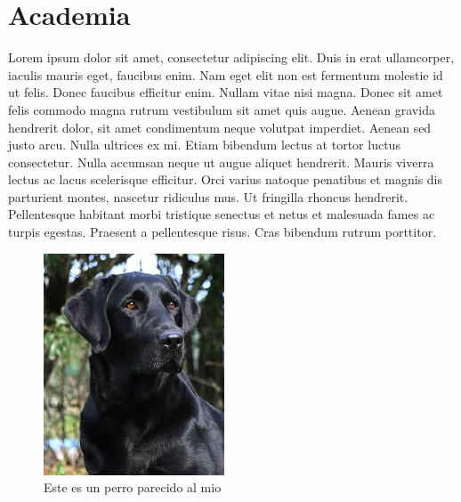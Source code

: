 	\section{Academia}
	Lorem ipsum dolor sit amet, consectetur adipiscing elit. Duis in erat 		ullamcorper, iaculis mauris eget, faucibus enim. Nam eget elit non est 		fermentum molestie id ut felis. Donec faucibus efficitur enim. Nullam 		vitae 		nisi magna. Donec sit amet felis commodo magna rutrum 			vestibulum sit amet quis augue. Aenean gravida hendrerit dolor, sit amet 		condimentum neque volutpat imperdiet. Aenean sed justo arcu. Nulla 			ultrices ex mi. Etiam bibendum lectus at tortor luctus consectetur. Nulla 	accumsan neque ut augue aliquet hendrerit. Mauris viverra lectus ac lacus 	scelerisque efficitur. Orci varius natoque penatibus et magnis dis 			parturient montes, nascetur ridiculus mus. Ut fringilla rhoncus   			hendrerit. Pellentesque habitant morbi tristique senectus et netus et  		malesuada fames ac turpis egestas. Praesent a pellentesque risus. Cras 		bibendum rutrum porttitor.
		\begin{figure}[h!]
			\centering
			\includegraphics[scale=0.8]{420003722/perro.jpg}
			\caption{Este es un perro parecido al mio}
		\end{figure}		

